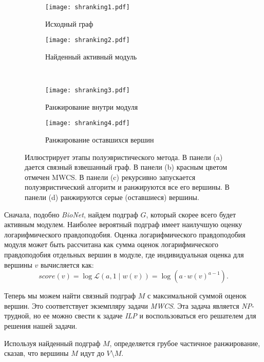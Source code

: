 \begin{figure}
    \begin{subfigure}{.5\textwidth}
        \centering
        \texttt{[image: shranking1.pdf]}
        \caption{Исходный граф} 
    \end{subfigure}%
    \begin{subfigure}{.5\textwidth}
        \centering
        \texttt{[image: shranking2.pdf]}
        \caption{Найденный активный модуль}
    \end{subfigure}\\[1ex]
    \begin{subfigure}{.5\textwidth}
        \centering
        \texttt{[image: shranking3.pdf]}
        \caption{Ранжирование внутри модуля}
    \end{subfigure}%
    \begin{subfigure}{.5\textwidth}
        \centering
        \texttt{[image: shranking4.pdf]}
        \caption{Ранжирование оставшихся вершин}
    \end{subfigure}
    \centering
    \caption{
        Иллюстрирует этапы полуэвристического метода.  В панели (a) дается
        связный взвешанный граф.  В панели (b) красным цветом отмечен MWCS.
        В панели (c) рекурсивно запускается полуэвристический алгоритм
        и ранжируются все его вершины.  В панели (d) ранжируются серые
        (оставшиеся) вершины.
    }%
    \label{fig:shranking}%
\end{figure}

Сначала, подобно \emph{BioNet}, найдем подграф $G$, который скорее всего будет
активным модулем.  Наиболее вероятный подграф имеет наилучшую оценку
логарифмического правдоподобия.  Оценка логарифмического правдоподобия модуля
может быть рассчитана как сумма оценок логарифмического правдоподобия отдельных
вершин в модуле, где индивидуальная оценка для вершины $v$ вычисляется как: \[
    score(v) = \log \mathcal{L} (a, 1 \mid w(v)) = \log(a \cdot {w(v)}^{a - 1}).\]

Теперь мы можем найти связный подграф $M$ с максимальной суммой оценок вершин.
Это соответствует экземпляру задачи \emph{MWCS}. Эта задача является
\emph{NP}-трудной, но ее можно свести к задаче \emph{ILP} и воспользоваться его
решателем для решения нашей задачи.

Используя найденный подграф $M$, определяется грубое частичное ранжирование,
сказав, что вершины $M$ идут до $V \setminus M$.

